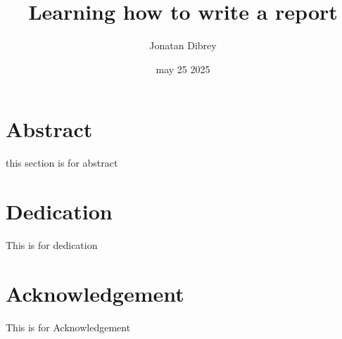 \documentclass[twoside,12pt]{report} %
\title{Learning how to write a report}
\author{Jonatan Dibrey}
\date{may 25 2025}
\begin{document}
\chapter*{Abstract}
this section is for abstract\\
\chapter*{Dedication}
This is for dedication  \\
\chapter*{Acknowledgement}
This is for Acknowledgement

\tableofcontents
\listoffigures





\appendix




\end{document}
